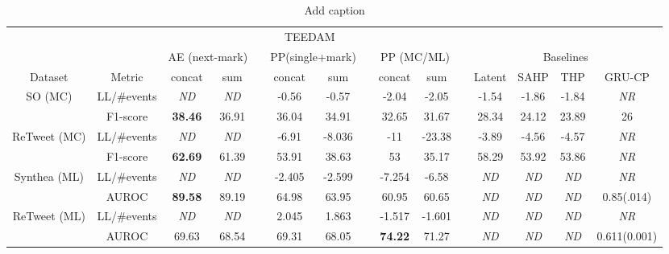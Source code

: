 \documentclass[journal,twoside,web]{ieeecolor}
\begin{document}
\begin{table}[htbp]
    \centering
    \caption{Add caption}
      \begin{tabular}{ccccccccccccccc}
      \toprule
      \toprule
            &       & \multicolumn{8}{c}{TEEDAM}                                    &       &       &       &       &  \\
  \cmidrule{3-10}          &       & \multicolumn{2}{c}{AE (next-mark)} &       & \multicolumn{2}{c}{PP(single+mark)} &       & \multicolumn{2}{c}{PP (MC/ML)} &       & \multicolumn{4}{c}{Baselines} \\
  \cmidrule{3-4}\cmidrule{6-7}\cmidrule{9-10}\cmidrule{12-15}    Dataset & Metric & concat & sum   &       & concat & sum   &       & concat & sum   &       & Latent & SAHP  & THP   & GRU-CP \\
      \midrule
      \multirow{2}[2]{*}{SO (MC)} & LL/\#events & \textit{ND} & \textit{ND} &       & -0.56 & -0.57 &       & -2.04 & -2.05 &       & -1.54 & -1.86 & -1.84 & \textit{NR} \\
            & F1-score & \textbf{38.46} & 36.91 &       & 36.04 & 34.91 &       & 32.65 & 31.67 &       & 28.34 & 24.12 & 23.89 & 26 \\
      \midrule
      \multirow{2}[2]{*}{ReTweet (MC)} & LL/\#events & \textit{ND} & \textit{ND} &       & -6.91 & -8.036 &       & -11   & -23.38 &       & -3.89 & -4.56 & -4.57 & \textit{NR} \\
            & F1-score & \textbf{62.69} & 61.39 &       & 53.91 & 38.63 &       & 53    & 35.17 &       & 58.29 & 53.92 & 53.86 & \textit{NR} \\
      \midrule
      \multirow{2}[2]{*}{Synthea (ML)} & LL/\#events & \textit{ND} & \textit{ND} &       & -2.405 & -2.599 &       & -7.254 & -6.58 &       & \textit{ND} & \textit{ND} & \textit{ND} & \textit{NR} \\
            & AUROC & \textbf{89.58} & 89.19 &       & 64.98 & 63.95 &       & 60.95 & 60.65 &       & \textit{ND} & \textit{ND} & \textit{ND} & 0.85(.014) \\
      \midrule
      \multirow{2}[2]{*}{ReTweet (ML)} & LL/\#events & \textit{ND} & \textit{ND} &       & 2.045 & 1.863 &       & -1.517 & -1.601 &       & \textit{ND} & \textit{ND} & \textit{ND} & \textit{NR} \\
            & AUROC & 69.63 & 68.54 &       & 69.31 & 68.05 &       & \textbf{74.22} & 71.27 &       & \textit{ND} & \textit{ND} & \textit{ND} & 0.611(0.001) \\
      \bottomrule
      \bottomrule
      \end{tabular}%
    \label{tab:1}%
  \end{table}%
  
\end{document}
